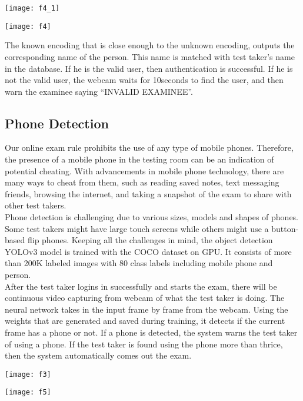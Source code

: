 \documentclass[12pt]{report}
\begin{document}
\begin{center}
\begin{minipage}{0.49\linewidth}
\texttt{[image: f4\_1]}
\end{minipage}%
\hfill
\begin{minipage}{0.49\linewidth}
\texttt{[image: f4]}
\end{minipage}
\end{center}

		The known encoding that is close enough to the unknown encoding, outputs the corresponding name of the person. This name is matched with test taker’s name in the database. If he is the valid user, then authentication is successful. If he is not the valid user, the webcam waits for 10seconds to find the user, and then warn the examinee saying “INVALID EXAMINEE”.
\subsection{Phone Detection}

Our online exam rule prohibits the use of any type of mobile phones. Therefore, the presence of a mobile phone in the testing room can be an indication of potential cheating. With advancements in mobile phone technology, there are many ways to cheat from them, such as reading saved notes, text messaging friends, browsing the internet, and taking a snapshot of the exam to share with other test takers.\\

		Phone detection is challenging due to various sizes, models and shapes of phones. Some test takers might have large touch screens while others might use a button-based flip phones. Keeping all the challenges in mind, the object detection YOLOv3 model is trained with the COCO dataset on GPU. It consists of more than 200K labeled images with 80 class labels including mobile phone and person.\\
 
		After the test taker logins in successfully and starts the exam, there will be continuous video capturing from webcam of what the test taker is  doing. The neural network takes in the input frame by frame from the webcam. Using the weights that are generated and saved during training, it detects if the current frame has a phone or not. If a phone is detected, the system warns the test taker of using a phone. If the test taker is found using the phone more than thrice, then the system automatically comes out the exam. 
\begin{center}
\begin{minipage}{0.49\linewidth}
\texttt{[image: f3]}
\end{minipage}%
\hfill
\begin{minipage}{0.49\linewidth}
\texttt{[image: f5]}
\end{minipage}
\end{center}
\end{document}
